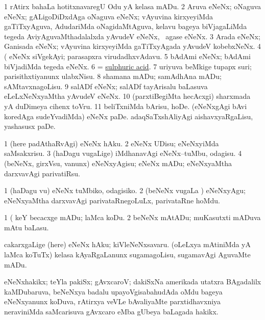 \noindent
\gl{\pagu}
\bmng
{} 
\bnum
\num{1}  rAtirx bahaLa hotitxnavaregU Odu yA kelasa mADu. 
\num{2}  Aruva eNeNx; oNaguva eNeNx; gALigoDiDxdAga oNaguva eNeNx; vAyuvina kirxyeyiMda gaTiTxyAguva, AdudariMda oNagidaMtAguva, kelavu bageya biVjagaLiMda tegeda AviyAguvaMthadalalxda yAvudeV eNeNx, \udA\ agase eNeNx. 
\num{3}  Arada eNeNx; Ganisada eNeNx; vAyuvina kirxyeyiMda gaTiTxyAgada yAvudeV kobebxNeNx. 
\num{4}  (  eNeNx siVgekAyi; parasapxra virudadhxvAdavu. 
\num{5}  bAdAmi eNeNx; bAdAmi biVjadiMda tegeda eNeNx. 
\num{6}  = \hyperref{kandict_s.pdf}{S}{sulphuric acid}{sulphuric acid}. 
\num{7}  uriyuva beMkige tupapx suri; parisithxtiyanunx ulabxNisu. 
\num{8}  shamana mADu; samAdhAna mADu; sAMtavxnagoLisu. 
\num{9}  salADf eNeNx; salADf tayArisalu baLasuva eLeLxNeNxyaMtha yAvudeV eNeNx. 
\num{10}  (parxtiBegiMta hecAcxgi) sharxmada yA duDimeya cihenx toVru. 
\num{11}  beliTxniMda bArisu, hoDe. 
  
\banum
{} (eNeNxgAgi bAvi koredAga sudeYvadiMda) eNeNx paDe. 
 adaqSaTxshAliyAgi aishavxyaRgaLisu, yashasusx paDe. 
\eanum
\numie
\enum
\emng
\eentry

\bentry
{}
\gl{\sakirx}
\bmng
\bnum
\num{1} (here padAthaRvAgi) eNeNx hAku. 
\num{2} eNeNx UDisu; eNeNxyiMda saMsakxrisu. 
\num{3} (haDagu \mo vugaLige) iMdhanavAgi eNeNx--tuMbu, odagisu. 
\num{4} (beNeNx, girxVsu, \mo vanunx) eNeNxyAgisu; eNeNx mADu; eNeNxyaMtha darxvavAgi parivatiRsu. 
\enum
\emng

\noindent
\gl{\akirx}
\bmng
\bnum
\num{1} (haDagu \mo vu) eNeNx tuMbiko, odagisiko. 
\num{2} (beNeNx \mo vugaLa \vi) eNeNxyAgu; eNeNxyaMtha darxvavAgi parivataRnegoLuLx, parivataRne hoMdu. 
\enum
\emng

\noindent
\gl{\pagu}
\bmng
\bnum
\num{1}  (  keY becacxge mADu; laMca koDu. 
\num{2}  beNeNx mAtADu; muKasutxti mADuva mAtu baLasu. 
  
\banum
{} cakarxgaLige (here) eNeNx hAku; kiVleNeNxsavaru. 
 (oLeLxya mAtiniMda yA laMca koTuTx) kelasa kAyaRgaLanunx sugamagoLisu, sugamavAgi AguvaMte mADu. 
\eanum
\numie
\enum
\emng
\eentry

\bentry
{}
\gl{\nA}
\bmng
eNeNxhakikx; teYla pakiSx; gAvxcaroV; dakiSxNa amerikada utatxra BAgadalilx kaMDubaruva, beNeNxya badalu upayoVgisabahudAda oMdu bageya eNeNxyanunx koDuva, rAtirxya veVLe bAvaliyaMte parxtidhavxniya neraviniMda saMcarisuva gAvxcaro eMba gUbeya baLagada hakikx. 
\emng
\eentry

